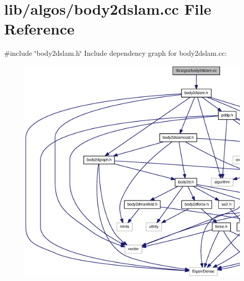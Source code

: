 \section{lib/algos/body2dslam.cc \-File \-Reference}
\label{body2dslam_8cc}
{\ttfamily \#include \char`\"{}body2dslam.\-h\char`\"{}}\*
\-Include dependency graph for body2dslam.\-cc\-:
\nopagebreak
\begin{figure}[H]
\begin{center}
\leavevmode
\includegraphics[width=350pt]{body2dslam_8cc__incl}
\end{center}
\end{figure}
